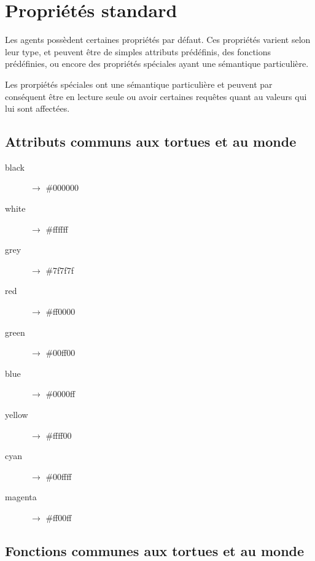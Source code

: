 \section{Propriétés standard}

Les agents possèdent certaines propriétés par défaut. Ces propriétés varient selon leur type, et peuvent être de simples attributs prédéfinis, des fonctions prédéfinies, ou encore des propriétés spéciales ayant une sémantique particulière.

Les prorpiétés spéciales ont une sémantique particulière et peuvent par conséquent être en lecture seule ou avoir certaines requêtes quant au valeurs qui lui sont affectées.

\subsection{Attributs communs aux tortues et au monde}

\begin{description}
	\item[black] $\rightarrow$ \#000000
	\item[white] $\rightarrow$ \#ffffff
	\item[grey] $\rightarrow$ \#7f7f7f
	\item[red] $\rightarrow$ \#ff0000
	\item[green] $\rightarrow$ \#00ff00
	\item[blue] $\rightarrow$ \#0000ff
	\item[yellow] $\rightarrow$ \#ffff00
	\item[cyan] $\rightarrow$ \#00ffff
	\item[magenta] $\rightarrow$ \#ff00ff
\end{description}

\subsection{Fonctions communes aux tortues et au monde}


